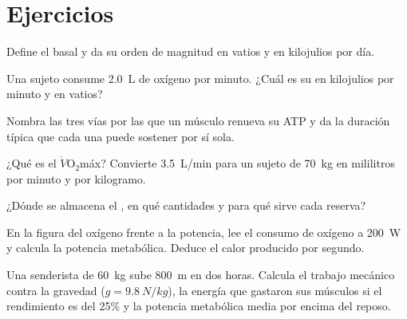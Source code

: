 \section{Ejercicios}

\begin{exercise}[$\star$]\label{exo:g10:exercise-and-energy:1}
Define el  basal y da su orden de magnitud en vatios y en
kilojulios por día.
\end{exercise}

\begin{exercise}[$\star$]\label{exo:g10:exercise-and-energy:2}
Una sujeto consume \qty{2.0}{L} de oxígeno por minuto. ¿Cuál es su
 en kilojulios por minuto y en vatios?
\end{exercise}

\begin{exercise}[$\star$]\label{exo:g10:exercise-and-energy:3}
Nombra las tres vías por las que un músculo renueva su ATP y da la
duración típica que cada una puede sostener por sí sola.
\end{exercise}

\begin{exercise}[$\star$]\label{exo:g10:exercise-and-energy:4}
¿Qué es el $\dot V\!\mathrm{O_2}$máx? Convierte \qty{3.5}{L/min} para
un sujeto de \qty{70}{kg} en mililitros por minuto y por kilogramo.
\end{exercise}

\begin{exercise}[$\star$]\label{exo:g10:exercise-and-energy:5}
¿Dónde se almacena el , en qué cantidades y para qué sirve
cada reserva?
\end{exercise}

\begin{exercise}[$\star\star$]\label{exo:g10:exercise-and-energy:6}
En la figura del oxígeno frente a la potencia, lee el consumo de
oxígeno a \qty{200}{W} y calcula la potencia metabólica. Deduce el
calor producido por segundo.
\end{exercise}

\begin{exercise}[$\star\star$]\label{exo:g10:exercise-and-energy:7}
Una senderista de \qty{60}{kg} sube \qty{800}{m} en dos horas. Calcula
el trabajo mecánico contra la gravedad ($g = \qty{9.8}{N/kg}$), la
energía que gastaron sus músculos si el rendimiento es del 25\% y la
potencia metabólica media por encima del reposo.
\end{exercise}

